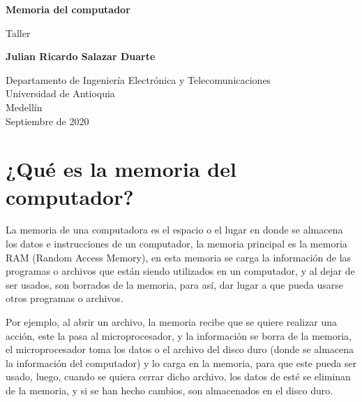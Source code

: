 \documentclass{article}
\begin{document}
\begin{titlepage}
    \begin{center}
        \vspace*{1cm}
            
        \Huge
        \textbf{Memoria del computador}
            
        \vspace{0.5cm}
        \LARGE
        Taller
            
        \vspace{1.5cm}
            
        \textbf{Julian Ricardo Salazar Duarte}
            
        \vfill
            
        \vspace{0.8cm}
            
        \Large
        Departamento de Ingeniería Electrónica y Telecomunicaciones\\
        Universidad de Antioquia\\
        Medellín\\
        Septiembre de 2020
            
    \end{center}
\end{titlepage}

\tableofcontents

\newpage

\section{¿Qué es la memoria del computador?}
La memoria de una computadora es el espacio o el lugar en donde se almacena los datos e instrucciones de un computador, la memoria principal es la memoria RAM (Random Access Memory), en esta memoria se carga la información de las programas o archivos que están siendo utilizados en un computador, y al dejar de ser usados, son borrados de la memoria, para así, dar lugar a que pueda usarse otros programas o archivos.
\vspace{0.5cm}

Por ejemplo, al abrir un archivo, la memoria recibe que se quiere realizar una acción, este la pasa al microprocesador, y la información se borra de la memoria, el microprocesador toma los datos o el archivo del disco duro (donde se almacena la información del computador) y lo carga en la memoria, para que este pueda ser usado, luego, cuando se quiera cerrar dicho archivo, los datos de esté se eliminan de la memoria, y si se han hecho cambios, son almacenados en el disco duro.\cite{Salazar}
\end{document}
